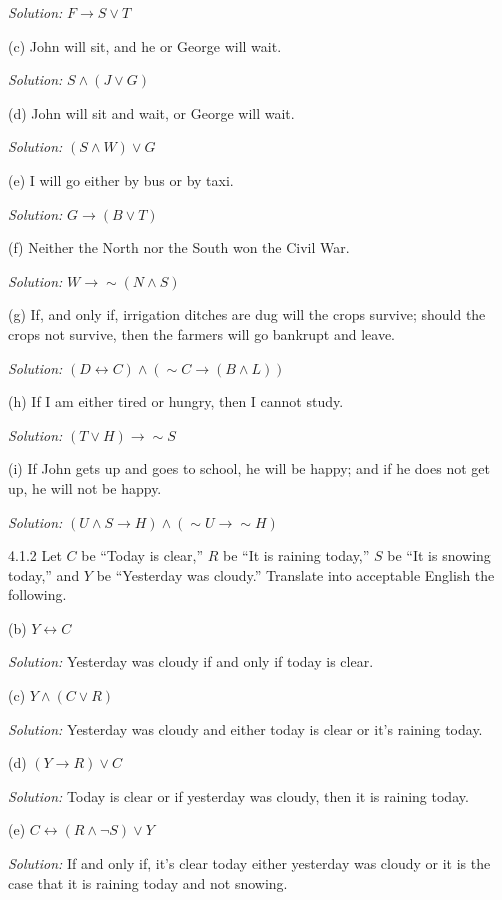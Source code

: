 \documentclass{letter}
\newcommand{\tmem}[1]{{\em #1\/}}
\begin{document}
{\tmem{Solution:}} $F \rightarrow S \vee T$

(c) John will sit, and he or George will wait.

{\tmem{Solution:}} $S \wedge (J \vee G)$

(d) John will sit and wait, or George will wait.

{\tmem{Solution:}} $(S \wedge W) \vee G$

(e) I will go either by bus or by taxi.

{\tmem{Solution:}} $G \rightarrow (B \vee T)$

(f) Neither the North nor the South won the Civil War.

{\tmem{Solution:}} $W \rightarrow \sim (N \wedge S)$

(g) If, and only if, irrigation ditches are dug will the crops survive; should
the crops not survive, then the farmers will go bankrupt and leave.

{\tmem{Solution:}} $(D \leftrightarrow C) \wedge (\sim C \rightarrow (B \wedge
L))$

(h) If I am either tired or hungry, then I cannot study.

{\tmem{Solution:}} $(T \vee H) \rightarrow \sim S$

(i) If John gets up and goes to school, he will be happy; and if he does not
get up, he will not be happy.

{\tmem{Solution:}} $(U \wedge S \rightarrow H) \wedge (\sim U \rightarrow \sim
H)$

4.1.2 Let $C$ be ``Today is clear,'' $R$ be ``It is raining today,'' $S$ be
``It is snowing today,'' and $Y$ be ``Yesterday was cloudy.'' Translate into
acceptable English the following.

(b) $Y \leftrightarrow C$

{\tmem{Solution:}} Yesterday was cloudy if and only if today is clear.

(c) $Y \wedge (C \vee R)$

{\tmem{Solution:}} Yesterday was cloudy and either today is clear or it's
raining today.

(d) $(Y \rightarrow R) \vee C$

{\tmem{Solution:}} Today is clear or if yesterday was cloudy, then it is
raining today.

(e) $C \leftrightarrow (R \wedge \neg S) \vee Y$

{\tmem{Solution:}} If and only if, it's clear today either yesterday was
cloudy or it is the case that it is raining today and not snowing.
\end{document}
